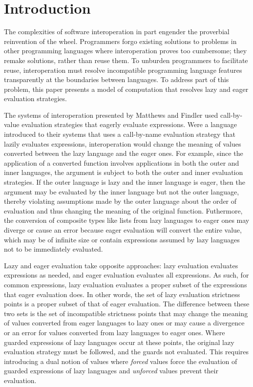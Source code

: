 \section{Introduction}

The complexities of software interoperation in part engender the proverbial reinvention of the wheel. Programmers forgo existing solutions to problems in other programming languages where interoperation proves too cumbersome; they remake solutions, rather than reuse them. To unburden programmers to facilitate reuse, interoperation must resolve incompatible programming language features transparently at the boundaries between languages. To address part of this problem, this paper presents a model of computation that resolves lazy and eager evaluation strategies.

The systems of interoperation presented by Matthews and Findler \cite{matthews07} used call-by-value evaluation strategies that eagerly evaluate expressions. Were a language introduced to their systems that uses a call-by-name evaluation strategy that lazily evaluates expressions, interoperation would change the meaning of values converted between the lazy language and the eager ones. For example, since the application of a converted function involves applications in both the outer and inner languages, the argument is subject to both the outer and inner evaluation strategies. If the outer language is lazy and the inner language is eager, then the argument may be evaluated by the inner language but not the outer language, thereby violating assumptions made by the outer language about the order of evaluation and thus changing the meaning of the original function. Futhermore, the conversion of composite types like lists from lazy languages to eager ones may diverge or cause an error because eager evaluation will convert the entire value, which may be of infinite size or contain expressions assumed by lazy languages not to be immediately evaluated.

Lazy and eager evaluation take opposite approaches: lazy evaluation evaluates expressions as needed, and eager evaluation evaluates all expressions. As such, for common expressions, lazy evaluation evaluates a proper subset of the expressions that eager evaluation does. In other words, the set of lazy evaluation strictness points is a proper subset of that of eager evaluation. The difference between these two sets is the set of incompatible strictness points that may change the meaning of values converted from eager languages to lazy ones or may cause a divergence or an error for values converted from lazy languages to eager ones. Where guarded expressions of lazy languages occur at these points, the original lazy evaluation strategy must be followed, and the guards not evaluated. This requires introducing a dual notion of values where \emph{forced} values force the evaluation of guarded expressions of lazy languages and \emph{unforced} values prevent their evaluation.